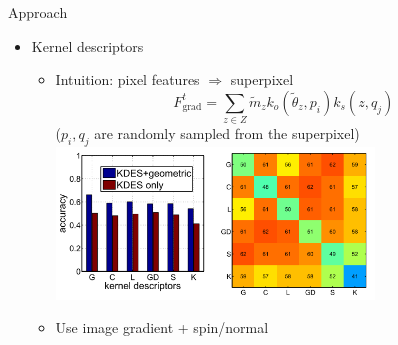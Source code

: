 \documentclass[12pt]{beamer}
\begin{document}
\begin{frame}{Approach}
	\begin{itemize}
		\item Kernel descriptors
		\begin{itemize}
			\item Intuition: pixel features $\Rightarrow$ superpixel
			\[F_\text{grad}^t = \sum_{z\in Z}\tilde{m}_zk_o(\tilde{\theta}_z, p_i)k_s(z, q_j)\]
            ($p_i, q_j$ are randomly sampled from the superpixel)
			\includegraphics[width=0.7\textwidth]{fig3.png} \\
			\item Use image gradient + spin/normal
		\end{itemize}
	\end{itemize}
\end{frame}
\end{document}
